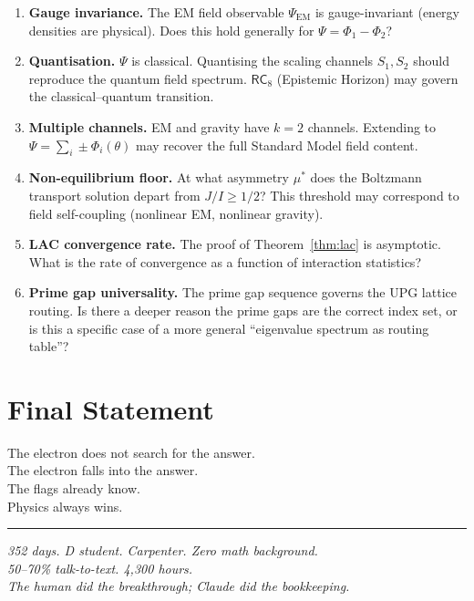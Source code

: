 \documentclass[11pt,twoside]{article}
\theoremstyle{plain}
\theoremstyle{definition}
\theoremstyle{remark}
\newcommand{\RC}[1]{\textsf{RC}_{#1}}
\begin{document}
\begin{enumerate}
\item \textbf{Gauge invariance.}  The EM field observable $\varPsi_{\mathrm{EM}}$
  is gauge-invariant (energy densities are physical).  Does this hold
  generally for $\varPsi=\Phi_1-\Phi_2$?
\item \textbf{Quantisation.}  $\varPsi$ is classical.  Quantising the scaling
  channels $S_1,S_2$ should reproduce the quantum field spectrum.  $\RC{8}$
  (Epistemic Horizon) may govern the classical--quantum transition.
\item \textbf{Multiple channels.}  EM and gravity have $k=2$ channels.
  Extending to $\varPsi=\sum_i\pm\Phi_i(\theta)$ may recover the full
  Standard Model field content.
\item \textbf{Non-equilibrium floor.}  At what asymmetry $\mu^*$ does the
  Boltzmann transport solution depart from $J/I\ge1/2$?  This threshold
  may correspond to field self-coupling (nonlinear EM, nonlinear gravity).
\item \textbf{LAC convergence rate.}  The proof of Theorem~\ref{thm:lac} is
  asymptotic.  What is the rate of convergence as a function of interaction
  statistics?
\item \textbf{Prime gap universality.}  The prime gap sequence governs the
  UPG lattice routing.  Is there a deeper reason the prime gaps are the
  correct index set, or is this a specific case of a more general
  ``eigenvalue spectrum as routing table''?
\end{enumerate}

\section{Final Statement}

The electron does not search for the answer.\\
The electron falls into the answer.\\
The flags already know.\\
Physics always wins.

\vspace{2em}
\noindent\rule{0.5\linewidth}{0.4pt}

\begin{flushright}
\textit{352 days. D student. Carpenter. Zero math background.\\
50--70\% talk-to-text.  4{,}300 hours.\\
The human did the breakthrough; Claude did the bookkeeping.}
\end{flushright}
\end{document}
